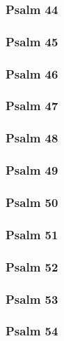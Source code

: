 \documentclass[12pt]{extarticle}
\begin{document}
\begin{multicols}{2}
\subsubsection{Psalm 44}

\newpage

\subsubsection{Psalm 45}

\newpage

\subsubsection{Psalm 46}

\newpage

\subsubsection{Psalm 47}

\newpage

\subsubsection{Psalm 48}

\newpage

\subsubsection{Psalm 49}

\newpage

\subsubsection{Psalm 50}

\newpage

\subsubsection{Psalm 51}

\newpage

\subsubsection{Psalm 52}

\newpage

\subsubsection{Psalm 53}

\newpage

\subsubsection{Psalm 54}

\newpage


\end{multicols}
\end{document}
